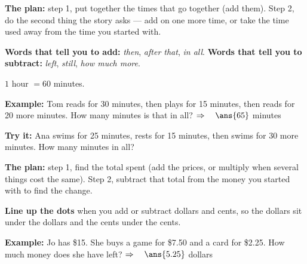 \documentclass[12pt]{article}
\begin{document}


\begin{formulabox}
\textbf{The plan:} step 1, put together the times that go together (add them).
Step 2, do the second thing the story asks --- add on one more time, or take the
time used away from the time you started with.\par
\textbf{Words that tell you to add:} \emph{then}, \emph{after that}, \emph{in all}.
\textbf{Words that tell you to subtract:} \emph{left}, \emph{still}, \emph{how much more}.\par
$1$ hour $= 60$ minutes.
\end{formulabox}

\begin{examplebox}
\textbf{Example:} Tom reads for 30 minutes, then plays for 15 minutes, then reads
for 20 more minutes. How many minutes is that in all?
$\Rightarrow\quad \ans{65}$ minutes
\end{examplebox}

\begin{tryitbox}
\textbf{Try it:} Ana swims for 25 minutes, rests for 15 minutes, then swims for
30 more minutes. How many minutes in all?\\[2pt]
\end{tryitbox}


\begin{formulabox}
\textbf{The plan:} step 1, find the total spent (add the prices, or multiply when
several things cost the same). Step 2, subtract that total from the money you
started with to find the change.\par
\textbf{Line up the dots} when you add or subtract dollars and cents, so the dollars
sit under the dollars and the cents under the cents.
\end{formulabox}

\begin{examplebox}
\textbf{Example:} Jo has \$15. She buys a game for \$7.50 and a card for \$2.25.
How much money does she have left?
$\Rightarrow\quad \ans{5.25}$ dollars
\end{examplebox}
\end{document}
